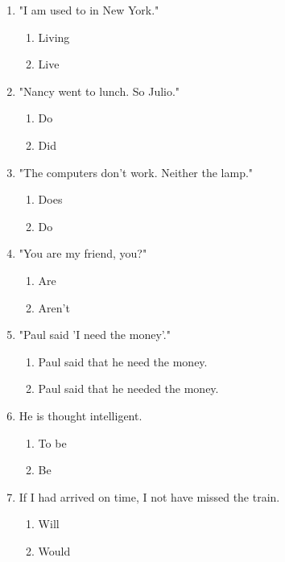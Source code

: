 \documentclass[11pt,a4paper]{article}
\begin{document}
\begin{enumerate}
    \item "I am used to \underline{\hspace{2cm}} in New York."
    \begin{enumerate}[label=\alph*.] \item Living \item Live \end{enumerate}

    \item "Nancy went to lunch. So \underline{\hspace{2cm}} Julio."
    \begin{enumerate}[label=\alph*.] \item Do \item Did \end{enumerate}

    \item "The computers don't work. Neither \underline{\hspace{2cm}} the lamp."
    \begin{enumerate}[label=\alph*.] \item Does \item Do \end{enumerate}

    \item "You are my friend, \underline{\hspace{2cm}} you?"
    \begin{enumerate}[label=\alph*.] \item Are \item Aren't \end{enumerate}

    \item "Paul said 'I need the money'."
    \begin{enumerate}[label=\alph*.] 
        \item Paul said that he need the money.
        \item Paul said that he needed the money.
    \end{enumerate}

    \item He is thought \underline{\hspace{2cm}} intelligent.
    \begin{enumerate}[label=\alph*.] \item To be \item Be \end{enumerate}

    \item If I had arrived on time, I \underline{\hspace{2cm}} not have missed the train.
    \begin{enumerate}[label=\alph*.] \item Will \item Would \end{enumerate}


\end{enumerate}
\end{document}
